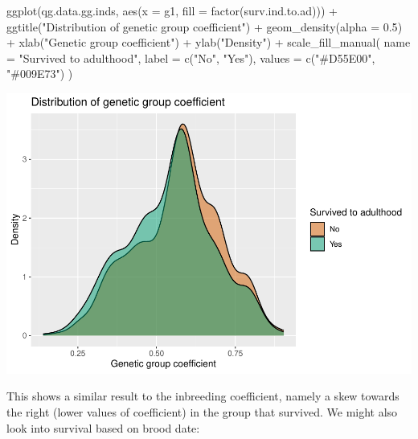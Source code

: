 \documentclass[
]{article}
\newenvironment{Shaded}{\begin{snugshade}}{\end{snugshade}}
\newcommand{\AttributeTok}[1]{\textcolor[rgb]{0.77,0.63,0.00}{#1}}
\newcommand{\FloatTok}[1]{\textcolor[rgb]{0.00,0.00,0.81}{#1}}
\newcommand{\FunctionTok}[1]{\textcolor[rgb]{0.00,0.00,0.00}{#1}}
\newcommand{\NormalTok}[1]{#1}
\newcommand{\SpecialCharTok}[1]{\textcolor[rgb]{0.00,0.00,0.00}{#1}}
\newcommand{\StringTok}[1]{\textcolor[rgb]{0.31,0.60,0.02}{#1}}
\begin{document}
\begin{Shaded}
\begin{Highlighting}[]
\FunctionTok{ggplot}\NormalTok{(qg.data.gg.inds, }\FunctionTok{aes}\NormalTok{(}\AttributeTok{x =}\NormalTok{ g1, }\AttributeTok{fill =} \FunctionTok{factor}\NormalTok{(surv.ind.to.ad))) }\SpecialCharTok{+}
  \FunctionTok{ggtitle}\NormalTok{(}\StringTok{"Distribution of genetic group coefficient"}\NormalTok{) }\SpecialCharTok{+}
  \FunctionTok{geom\_density}\NormalTok{(}\AttributeTok{alpha =} \FloatTok{0.5}\NormalTok{) }\SpecialCharTok{+}
  \FunctionTok{xlab}\NormalTok{(}\StringTok{"Genetic group coefficient"}\NormalTok{) }\SpecialCharTok{+}
  \FunctionTok{ylab}\NormalTok{(}\StringTok{"Density"}\NormalTok{) }\SpecialCharTok{+}
  \FunctionTok{scale\_fill\_manual}\NormalTok{(}
    \AttributeTok{name =} \StringTok{"Survived to adulthood"}\NormalTok{,}
    \AttributeTok{label =} \FunctionTok{c}\NormalTok{(}\StringTok{"No"}\NormalTok{, }\StringTok{"Yes"}\NormalTok{),}
    \AttributeTok{values =} \FunctionTok{c}\NormalTok{(}\StringTok{"\#D55E00"}\NormalTok{, }\StringTok{"\#009E73"}\NormalTok{)}
\NormalTok{  )}
\end{Highlighting}
\end{Shaded}

\includegraphics{EDA_files/figure-latex/unnamed-chunk-10-1.pdf}

This shows a similar result to the inbreeding coefficient, namely a skew
towards the right (lower values of coefficient) in the group that
survived. We might also look into survival based on brood date:
\end{document}
